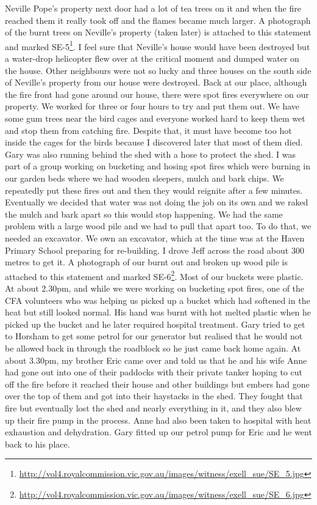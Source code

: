 \documentclass[a4paper]{article}
\begin{document}
    Neville Pope's property next door had a lot of tea trees on it and when the fire reached them it really took off and the flames became much larger. A photograph of the burnt trees on Neville's property (taken later) is attached to this statement and marked SE-5\footnote{\url{http://vol4.royalcommission.vic.gov.au/images/witness/exell_sue/SE_5.jpg}}. I feel sure that Neville's house would have been destroyed but a water-drop helicopter flew over at the critical moment and dumped water on the house. Other neighbours were not so lucky and three houses on the south side of Neville's property from our house were destroyed.
    Back at our place, although the fire front had gone around our house, there were spot fires everywhere on our property. We worked for three or four hours to try and put them out. We have some gum trees near the bird cages and everyone worked hard to keep them wet and stop them from catching fire. Despite that, it must have become too hot inside the cages for the birds because I discovered later that most of them died. Gary was also running behind the shed with a hose to protect the shed. I was part of a group working on bucketing and hosing spot fires which were burning in our garden beds where we had wooden sleepers, mulch and bark chips. We repeatedly put these fires out and then they would reignite after a few minutes. Eventually we decided that water was not doing the job on its own and we raked the mulch and bark apart so this would stop happening. We had the same problem with a large wood pile and we had to pull that apart too. To do that, we needed an excavator. We own an excavator, which at the time was at the Haven Primary School preparing for re-building. I drove Jeff across the road about 300 metres to get it. A photograph of our burnt out and broken up wood pile is attached to this statement and marked SE-6\footnote{\url{http://vol4.royalcommission.vic.gov.au/images/witness/exell_sue/SE_6.jpg}}. Most of our buckets were plastic. At about 2.30pm, and while we were working on bucketing spot fires, one of the CFA volunteers who was helping us picked up a bucket which had softened in the heat but still looked normal. His hand was burnt with hot melted plastic when he picked up the bucket and he later required hospital treatment. Gary tried to get to Horsham to get some petrol for our generator but realised that he would not be allowed back in through the roadblock so he just came back home again.
    At about 3.30pm, my brother Eric came over and told us that he and his wife Anne had gone out into one of their paddocks with their private tanker hoping to cut off the fire before it reached their house and other buildings but embers had gone over the top of them and got into their haystacks in the shed. They fought that fire but eventually lost the shed and nearly everything in it, and they also blew up their fire pump in the process. Anne had also been taken to hospital with heat exhaustion and dehydration. Gary fitted up our petrol pump for Eric and he went back to his place.
\end{document}
